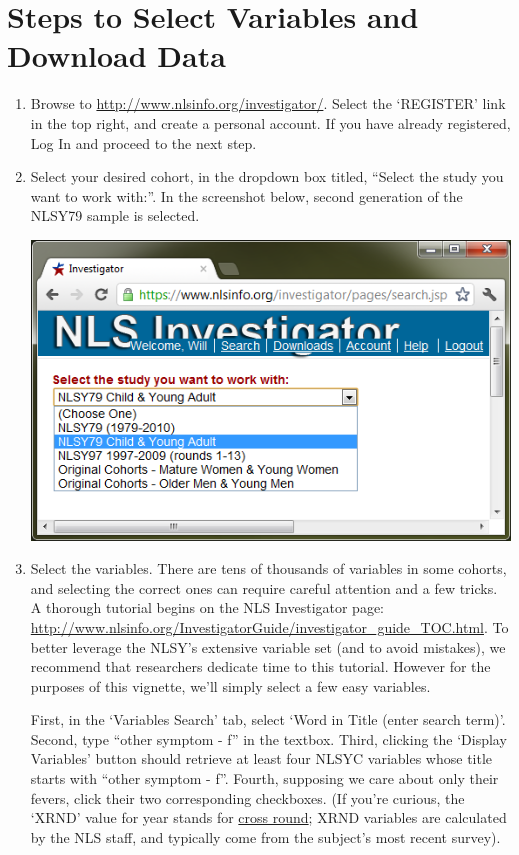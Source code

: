 \documentclass{article}\usepackage[]{graphicx}\usepackage[]{color}
\begin{document}
\section{Steps to Select Variables and Download Data}
\begin{enumerate}
\item Browse to \url{http://www.nlsinfo.org/investigator/}.  Select the `REGISTER' link in the top right, and create a personal account.  If you have already registered, Log In and proceed to the next step.
\item Select your desired cohort, in the dropdown box titled, ``Select the study you want to work with:''.  In the screenshot below, second generation of the NLSY79 sample is selected.

\includegraphics{./GraphicsNlsInvestigator/Cohort.png}

\item Select the variables.  There are tens of thousands of variables in some cohorts, and selecting the correct ones can require careful attention and a few tricks.  A thorough tutorial begins on the NLS Investigator page: \url{http://www.nlsinfo.org/InvestigatorGuide/investigator_guide_TOC.html}.  To better leverage the NLSY's extensive variable set (and to avoid mistakes), we recommend that researchers dedicate time to this tutorial.  However for the purposes of this vignette, we'll simply select a few easy variables.  

First, in the `Variables Search' tab, select `Word in Title (enter search term)'.  Second, type ``other symptom - f'' in the textbox.  Third, clicking the `Display Variables' button should retrieve at least four NLSYC variables whose title starts with ``other symptom - f''.  Fourth, supposing we care about only their fevers, click their two corresponding checkboxes.  (If you're curious, the `XRND' value for year stands for \href{http://www.bls.gov/nls/nls138.pdf}{cross round}; XRND variables are calculated by the NLS staff, and typically come from the subject's most recent survey).


\end{enumerate}
\end{document}
